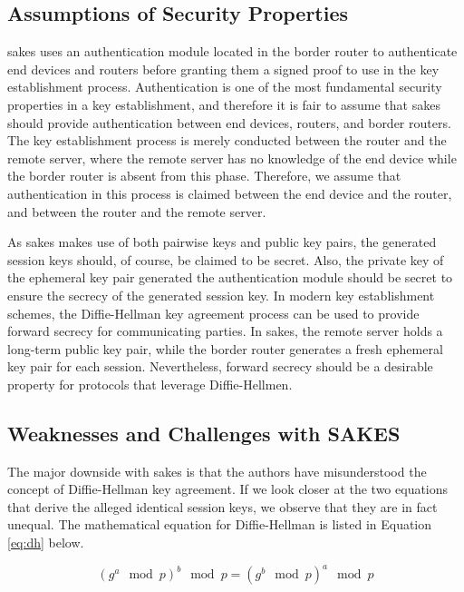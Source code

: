 \subsection{Assumptions of Security Properties}
\label{subsec:sakes-props}

\gls{sakes} uses an authentication module located in the border router to authenticate end devices and routers before granting them a signed proof to use in the key establishment process. Authentication is one of the most fundamental security properties in a key establishment, and therefore it is fair to assume that \gls{sakes} should provide authentication between end devices, routers, and border routers. The key establishment process is merely conducted between the router and the remote server, where the remote server has no knowledge of the end device while the border router is absent from this phase. Therefore, we assume that authentication in this process is claimed between the end device and the router, and between the router and the remote server.

As \gls{sakes} makes use of both pairwise keys and public key pairs, the generated session keys should, of course, be claimed to be secret. Also, the private key of the ephemeral key pair generated the authentication module should be secret to ensure the secrecy of the generated session key. In modern key establishment schemes, the Diffie-Hellman key agreement process can be used to provide forward secrecy for communicating parties. In \gls{sakes}, the remote server holds a long-term public key pair, while the border router generates a fresh ephemeral key pair for each session. Nevertheless, forward secrecy should be a desirable property for protocols that leverage Diffie-Hellmen. 


\subsection{Weaknesses and Challenges with SAKES}

The major downside with \gls{sakes} is that the authors have misunderstood the concept of Diffie-Hellman key agreement. If we look closer at the two equations that derive the alleged identical session keys, we observe that they are in fact unequal. The mathematical equation for Diffie-Hellman is listed in Equation \ref{eq:dh} below.

\begin{equation}
\label{eq:dh}
(g^a \mod p)^b \mod p = (g^b \mod p)^a \mod p
\end{equation}

